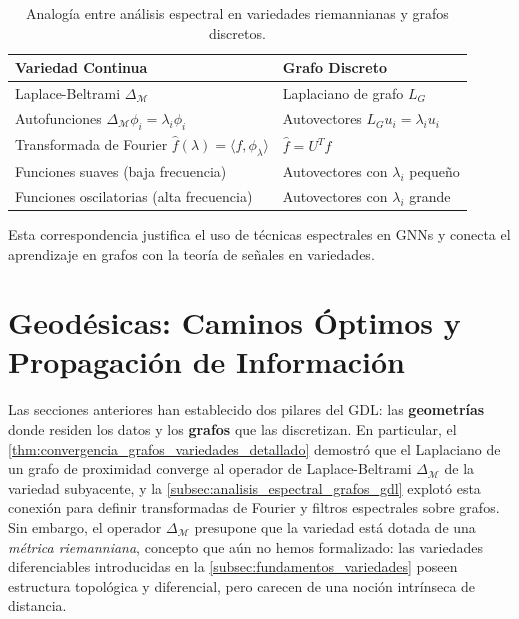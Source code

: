 \begin{table}[htbp]
\centering
\begin{tabular}{|l|l|}
\hline
\textbf{Variedad Continua} & \textbf{Grafo Discreto} \\
\hline
Laplace-Beltrami $\Delta_\mathcal{M}$ & Laplaciano de grafo $L_G$ \\
Autofunciones $\Delta_\mathcal{M} \phi_i = \lambda_i \phi_i$ & Autovectores $L_G u_i = \lambda_i u_i$ \\
Transformada de Fourier $\hat{f}(\lambda) = \langle f, \phi_\lambda \rangle$ & $\hat{f} = U^T f$ \\
Funciones suaves (baja frecuencia) & Autovectores con $\lambda_i$ pequeño \\
Funciones oscilatorias (alta frecuencia) & Autovectores con $\lambda_i$ grande \\
\hline
\end{tabular}
\caption[Analogía entre análisis espectral en variedades y grafos]{Analogía entre análisis espectral en variedades riemannianas y grafos discretos.}
\label{tab:analogia_espectral_variedades_grafos}
\end{table}

Esta correspondencia justifica el uso de técnicas espectrales en \glspl{GNN} y conecta el aprendizaje en grafos con la teoría de señales en variedades.

\section{Geodésicas: Caminos Óptimos y Propagación de Información}\label{sec:geodesicas_propagacion}

Las secciones anteriores han establecido dos pilares del \gls{GDL}: las \textbf{geometrías} donde residen los datos y los \textbf{grafos} que las discretizan. En particular, el \autoref{thm:convergencia_grafos_variedades_detallado} demostró que el Laplaciano de un grafo de proximidad converge al operador de Laplace-Beltrami $\Delta_\mathcal{M}$ de la variedad subyacente, y la \autoref{subsec:analisis_espectral_grafos_gdl} explotó esta conexión para definir transformadas de Fourier y filtros espectrales sobre grafos. Sin embargo, el operador $\Delta_\mathcal{M}$ presupone que la variedad está dotada de una \textit{métrica riemanniana}, concepto que aún no hemos formalizado: las variedades diferenciables introducidas en la \autoref{subsec:fundamentos_variedades} poseen estructura topológica y diferencial, pero carecen de una noción intrínseca de distancia.

